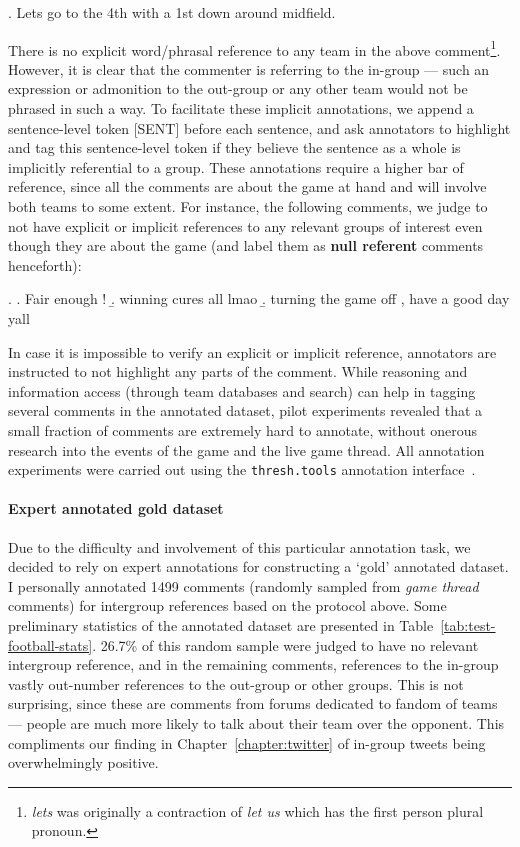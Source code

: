 \ex. Lets go to the 4th with a 1st down around midfield.

There is no explicit word/phrasal reference to any team in the above comment\footnote{\emph{lets} was originally a contraction of \emph{let us} which has the first person plural pronoun.}. However, it is clear that the commenter is referring to the in-group --- such an expression or admonition to the out-group or any other team would not be phrased in such a way. To facilitate these implicit annotations, we append a sentence-level token [SENT] before each sentence, and ask annotators to highlight and tag this sentence-level token if they believe the sentence as a whole is implicitly referential to a group. These annotations require a higher bar of reference, since all the comments are about the game at hand and will involve both teams to some extent. For instance, the following comments, we judge to not have explicit or implicit references to any relevant groups of interest even though they are about the game (and label them as \textbf{null referent} comments henceforth):

\ex. \a. Fair enough !
     \b. winning cures all lmao
     \b. turning the game off , have a good day yall
     
In case it is impossible to verify an explicit or implicit reference, annotators are instructed to not highlight any parts of the comment. While reasoning and information access (through team databases and search) can help in tagging several comments in the annotated dataset, pilot experiments revealed that a small fraction of comments are extremely hard to annotate, without onerous research into the events of the game and the live game thread. All annotation experiments were carried out using the \texttt{thresh.tools} annotation interface~\citep{heineman2023thresh}.

\paragraph{Expert annotated gold dataset} Due to the difficulty and involvement of this particular annotation task, we decided to rely on expert annotations for constructing a `gold' annotated dataset. I personally annotated 1499 comments (randomly sampled from \emph{game thread} comments) for intergroup references based on the protocol above. Some preliminary statistics of the annotated dataset are presented in Table~\ref{tab:test-football-stats}. 26.7\% of this random sample were judged to have no relevant intergroup reference, and in the remaining comments, references to the in-group vastly out-number references to the out-group or other groups. This is not surprising, since these are comments from forums dedicated to fandom of teams --- people are much more likely to talk about their team over the opponent. This compliments our finding in Chapter~\ref{chapter:twitter} of in-group tweets being overwhelmingly positive.

